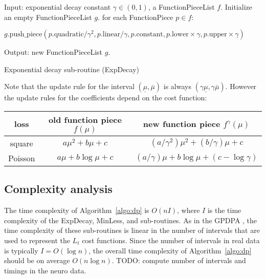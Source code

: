 \documentclass{article}
\begin{document}
\begin{algorithm}
  \begin{algorithmic}[1]
\STATE Input: 
exponential decay constant $\gamma\in(0,1)$,
a FunctionPieceList $f$.
\STATE Initialize an empty FunctionPieceList $g$.
\STATE for each FunctionPiece $p\in f$:
\begin{ALC@g}
  \STATE $g.\text{push\_piece}(
  p.\text{quadratic}/\gamma^2,
  p.\text{linear}/\gamma,
  p.\text{constant},
  p.\text{lower}\times\gamma,
  p.\text{upper}\times\gamma
  )$
\end{ALC@g}
\STATE Output: new FunctionPieceList $g$.
\caption{\label{algo:ExpDecay}Exponential decay sub-routine (ExpDecay)}
\end{algorithmic}
\end{algorithm}
Note that the update rule for the interval
$(\underline \mu, \overline \mu)$ is always
$(\gamma\underline\mu, \gamma\overline\mu)$. However the update rules
for the coefficients depend on the cost function:
\begin{center}
  \begin{tabular}{ccc}
  loss& old function piece $f(\mu)$ & new function piece $f^\gamma(\mu)$  \\
  \hline
  square & $a\mu^2 + b\mu + c$ & $(a/\gamma^2)\mu^2 + (b/\gamma)\mu + c$\\
  Poisson & $a\mu + b\log \mu + c$ & $(a/\gamma)\mu + b\log\mu + (c-\log\gamma)$
\end{tabular}
\end{center}

\subsection{Complexity analysis}

The time complexity of Algorithm~\ref{algo:dp} is $O(n I)$, where $I$
is the time complexity of the ExpDecay, MinLess, and 
sub-routines. As in the GPDPA \citep{HockingConstrained}, the time
complexity of these sub-routines is linear in the number of intervals
that are used to represent the $L_{ t}$ cost functions. Since the
number of intervals in real data is typically $I=O(\log n)$, the
overall time complexity of Algorithm~\ref{algo:dp} should be on
average $O(n \log n)$. TODO: compute number of intervals and timings
in the neuro data.




\end{document}
